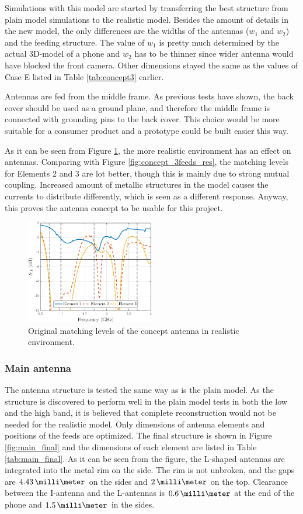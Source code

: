 Simulations with this model are started by transferring the best structure from plain model simulations to the realistic model. Besides the amount of details in the new model, the only differences are the widths of the antennas ($w_1$ and $w_2$) and the feeding structure. The value of $w_1$ is pretty much determined by the actual 3D-model of a phone and $w_2$ has to be thinner since wider antenna would have blocked the front camera. Other dimensions stayed the same as the values of Case E listed in Table \ref{tab:concept3} earlier.

Antennas are fed from the middle frame. As previous tests have shown, the back cover should be used as a ground plane, and therefore the middle frame is connected with grounding pins to the back cover. This choice would be more suitable for a consumer product and a prototype could be built easier this way. 

As it can be seen from Figure \ref{fig:main_orig}, the more realistic environment has an effect on antennas. Comparing with Figure \ref{fig:concept_3feeds_res}, the matching levels for Elements 2 and 3 are lot better, though this is mainly due to strong mutual coupling. Increased amount of metallic structures in the model causes the currents to distribute differently, which is seen as a different response. Anyway, this proves the antenna concept to be usable for this project.
\begin{figure}[H]
    \centering
    \includegraphics[width=0.5\textwidth]{img/main_orig.eps}
    \caption{Original matching levels of the concept antenna in realistic environment.}
    \label{fig:main_orig}
\end{figure}


\subsubsection{Main antenna}
\label{sec:main_antenna}
The antenna structure is tested the same way as is the plain model. As the structure is discovered to perform well in the plain model tests in both the low and the high band, it is believed that complete reconstruction would not be needed for the realistic model. Only dimensions of antenna elements and positions of the feeds are optimized. The final structure is shown in Figure \ref{fig:main_final} and the dimensions of each element are listed in Table \ref{tab:main_final}. As it can be seen from the figure, the L-shaped antennas are integrated into the metal rim on the side. The rim is not unbroken, and the gaps are $4.43\,\milli\meter$ on the sides and $2\,\milli\meter$ on the top. Clearance between the I-antenna and the L-antennas is $0.6\,\milli\meter$ at the end of the phone and $1.5\,\milli\meter$ in the sides.

